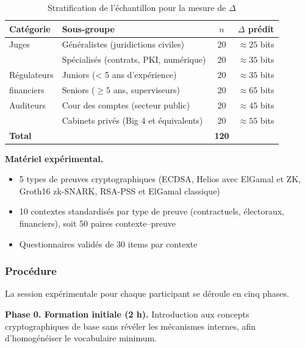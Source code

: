 \begin{sloppypar}
\begin{table}[htbp]
\centering
\caption{Stratification de l'\'echantillon pour la mesure de $\Delta$}
\label{tab:stratification_delta}
\begin{tabular}{@{}llcc@{}}
\toprule
\textbf{Cat\'egorie} & \textbf{Sous-groupe} & \textbf{$n$} & \textbf{$\Delta$ pr\'edit} \\
\midrule
Juges & G\'en\'eralistes (juridictions civiles) & 20 & $\approx 25$ bits \\
      & Sp\'ecialis\'es (contrats, PKI, num\'erique) & 20 & $\approx 35$ bits \\
\midrule
R\'egulateurs & Juniors (< 5 ans d'exp\'erience) & 20 & $\approx 35$ bits \\
financiers  & Seniors ($\geq 5$ ans, superviseurs) & 20 & $\approx 65$ bits \\
\midrule
Auditeurs & Cour des comptes (secteur public) & 20 & $\approx 45$ bits \\
          & Cabinets priv\'es (Big 4 et \'equivalents) & 20 & $\approx 55$ bits \\
\midrule
\textbf{Total} & & \textbf{120} & \\
\bottomrule
\end{tabular}
\end{table}

\noindent\textbf{Mat\'eriel exp\'erimental.}
\begin{itemize}
\item 5 types de preuves cryptographiques (ECDSA, Helios avec ElGamal et ZK,
      Groth16 zk-SNARK, RSA-PSS et ElGamal classique)
\item 10 contextes standardis\'es par type de preuve (contractuels,
      \'electoraux, financiers), soit 50 paires contexte--preuve
\item Questionnaires valid\'es de 30 items par contexte
\end{itemize}

\subsubsection{Proc\'edure}
\label{subsubsec:procedure_delta}

La session exp\'erimentale pour chaque participant se d\'eroule en cinq
phases.

\noindent\textbf{Phase 0. Formation initiale (2 h).}
Introduction aux concepts cryptographiques de base sans r\'ev\'eler les
m\'ecanismes internes, afin d'homog\'en\'eiser le vocabulaire minimum.


\end{sloppypar}
